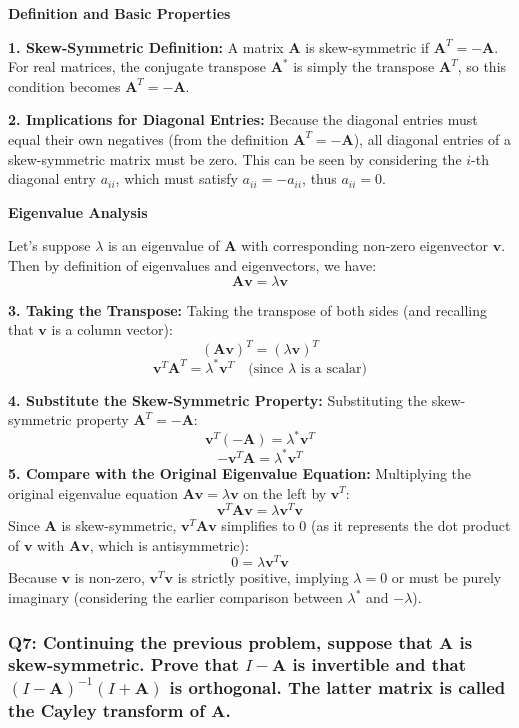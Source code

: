\documentclass[8pt]{article}
\begin{document}
{\textbf{Definition and Basic Properties}

\textbf{1. Skew-Symmetric Definition:}
   A matrix \(\mathbf{A}\) is skew-symmetric if \(\mathbf{A}^T = -\mathbf{A}\). For real matrices, the conjugate transpose \( \mathbf{A}^* \) is simply the transpose \( \mathbf{A}^T \), so this condition becomes \(\mathbf{A}^T = -\mathbf{A}\).

\textbf{2. Implications for Diagonal Entries:}
   Because the diagonal entries must equal their own negatives (from the definition \(\mathbf{A}^T = -\mathbf{A}\)), all diagonal entries of a skew-symmetric matrix must be zero. This can be seen by considering the \(i\)-th diagonal entry \( a_{ii} \), which must satisfy \( a_{ii} = -a_{ii} \), thus \( a_{ii} = 0 \).

\textbf{Eigenvalue Analysis}

Let's suppose \(\lambda\) is an eigenvalue of \(\mathbf{A}\) with corresponding non-zero eigenvector \(\mathbf{v}\). Then by definition of eigenvalues and eigenvectors, we have:
\[
\mathbf{A}\mathbf{v} = \lambda \mathbf{v}
\]

\textbf{3. Taking the Transpose:}
   Taking the transpose of both sides (and recalling that \( \mathbf{v} \) is a column vector):
   \[
   (\mathbf{A}\mathbf{v})^T = (\lambda \mathbf{v})^T
   \]
   \[
   \mathbf{v}^T \mathbf{A}^T = \lambda^* \mathbf{v}^T \quad \text{(since } \lambda \text{ is a scalar)}
   \]

\textbf{4. Substitute the Skew-Symmetric Property:}
   Substituting the skew-symmetric property \( \mathbf{A}^T = -\mathbf{A} \):
   \[
   \mathbf{v}^T (-\mathbf{A}) = \lambda^* \mathbf{v}^T
   \]
   \[
   -\mathbf{v}^T \mathbf{A} = \lambda^* \mathbf{v}^T
   \]
\textbf{5. Compare with the Original Eigenvalue Equation:}
   Multiplying the original eigenvalue equation \(\mathbf{A}\mathbf{v} = \lambda \mathbf{v}\) on the left by \(\mathbf{v}^T\):
   \[
   \mathbf{v}^T \mathbf{A} \mathbf{v} = \lambda \mathbf{v}^T \mathbf{v}
   \]
   Since \(\mathbf{A}\) is skew-symmetric, \(\mathbf{v}^T \mathbf{A} \mathbf{v}\) simplifies to \(0\) (as it represents the dot product of \(\mathbf{v}\) with \(\mathbf{A}\mathbf{v}\), which is antisymmetric):
   \[
   0 = \lambda \mathbf{v}^T \mathbf{v}
   \]
   Because \(\mathbf{v}\) is non-zero, \(\mathbf{v}^T \mathbf{v}\) is strictly positive, implying \(\lambda = 0\) or must be purely imaginary (considering the earlier comparison between \(\lambda^*\) and \(-\lambda\)).


\subsubsection*{Q7: Continuing the previous problem, suppose that \(\mathbf{A}\) is skew-symmetric. Prove that \(I - \mathbf{A}\) is invertible and that \((I - \mathbf{A})^{-1}(I + \mathbf{A})\) is orthogonal. The latter matrix is called the Cayley transform of \(\mathbf{A}\).}

}
\end{document}
